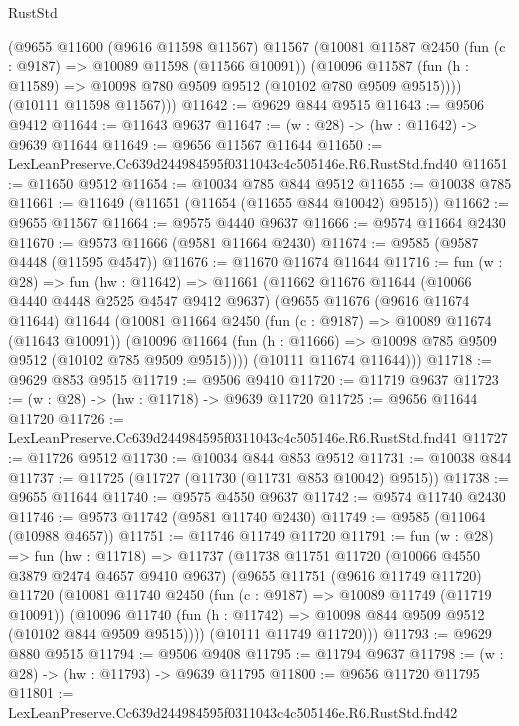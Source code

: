 \begin{lexlean}{RustStd}
\begin{coremodule}
      (@9655
        @11600
        (@9616 @11598 @11567)
        @11567
        (@10081
          @11587
          @2450
          (fun (c : @9187) => @10089 @11598 (@11566 @10091))
          (@10096 @11587 (fun (h : @11589) => @10098 @780 @9509 @9512 (@10102 @780 @9509 @9515))))
        (@10111 @11598 @11567)))
@11642 := @9629 @844 @9515
@11643 := @9506 @9412
@11644 := @11643 @9637
@11647 := (w : @28) -> (hw : @11642) -> @9639 @11644
@11649 := @9656 @11567 @11644
@11650 := LexLeanPreserve.Cc639d244984595f0311043c4c505146e.R6.RustStd.fnd40
@11651 := @11650 @9512
@11654 := @10034 @785 @844 @9512
@11655 := @10038 @785
@11661 := @11649 (@11651 (@11654 (@11655 @844 @10042) @9515))
@11662 := @9655 @11567
@11664 := @9575 @4440 @9637
@11666 := @9574 @11664 @2430
@11670 := @9573 @11666 (@9581 @11664 @2430)
@11674 := @9585 (@9587 @4448 (@11595 @4547))
@11676 := @11670 @11674 @11644
@11716 := fun (w : @28) =>
  fun (hw : @11642) =>
  @11661
    (@11662
      @11676
      @11644
      (@10066 @4440 @4448 @2525 @4547 @9412 @9637)
      (@9655
        @11676
        (@9616 @11674 @11644)
        @11644
        (@10081
          @11664
          @2450
          (fun (c : @9187) => @10089 @11674 (@11643 @10091))
          (@10096 @11664 (fun (h : @11666) => @10098 @785 @9509 @9512 (@10102 @785 @9509 @9515))))
        (@10111 @11674 @11644)))
@11718 := @9629 @853 @9515
@11719 := @9506 @9410
@11720 := @11719 @9637
@11723 := (w : @28) -> (hw : @11718) -> @9639 @11720
@11725 := @9656 @11644 @11720
@11726 := LexLeanPreserve.Cc639d244984595f0311043c4c505146e.R6.RustStd.fnd41
@11727 := @11726 @9512
@11730 := @10034 @844 @853 @9512
@11731 := @10038 @844
@11737 := @11725 (@11727 (@11730 (@11731 @853 @10042) @9515))
@11738 := @9655 @11644
@11740 := @9575 @4550 @9637
@11742 := @9574 @11740 @2430
@11746 := @9573 @11742 (@9581 @11740 @2430)
@11749 := @9585 (@11064 (@10988 @4657))
@11751 := @11746 @11749 @11720
@11791 := fun (w : @28) =>
  fun (hw : @11718) =>
  @11737
    (@11738
      @11751
      @11720
      (@10066 @4550 @3879 @2474 @4657 @9410 @9637)
      (@9655
        @11751
        (@9616 @11749 @11720)
        @11720
        (@10081
          @11740
          @2450
          (fun (c : @9187) => @10089 @11749 (@11719 @10091))
          (@10096 @11740 (fun (h : @11742) => @10098 @844 @9509 @9512 (@10102 @844 @9509 @9515))))
        (@10111 @11749 @11720)))
@11793 := @9629 @880 @9515
@11794 := @9506 @9408
@11795 := @11794 @9637
@11798 := (w : @28) -> (hw : @11793) -> @9639 @11795
@11800 := @9656 @11720 @11795
@11801 := LexLeanPreserve.Cc639d244984595f0311043c4c505146e.R6.RustStd.fnd42

\end{coremodule}
\end{lexlean}
